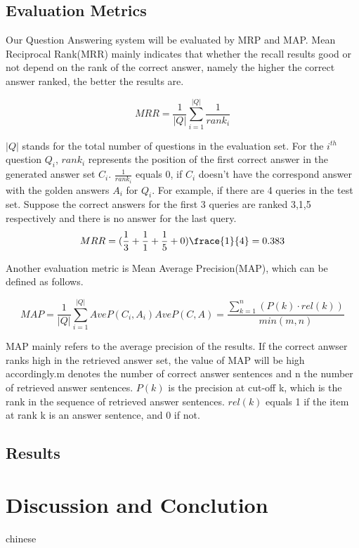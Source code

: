 \documentclass{llncs}
\begin{document}
\subsection{Evaluation Metrics}
Our Question Answering system will be evaluated by MRP and MAP. Mean Reciprocal Rank(MRR) mainly indicates that whether the recall results good or not depend on the rank of the correct answer, namely the higher the correct answer ranked, the better the results are. 

\begin{equation}
MRR=\frac{1}{|Q|}\sum_{i=1}^|Q|\frac{1}{rank_{i}}
\end{equation}

$|Q|$ stands for the total number of questions in the evaluation set. For the \(i^{th}\) question \(Q_{i}\), \(rank_{i}\) represents the position of the first correct answer in the generated answer set \(C_{i}\). \(\frac{1}{rank_{i}}\) equals 0, if \(C_{i}\) doesn't have the correspond answer with the golden answers \(A_{i}\) for \(Q_{i}\). For example, if there are 4 queries in the test set. Suppose the correct answers for the first 3 queries are ranked 3,1,5 respectively and there is no answer for the last query. 
$$MRR=(\frac{1}{3}+\frac{1}{1}+\frac{1}{5}+0)\frace{1}{4}=0.383$$

Another evaluation metric is Mean Average Precision(MAP), which can be defined as follows.

\begin{equation}
MAP=\frac{1}{|Q|}\sum_{i=1}^|Q|AveP(C_{i},A_{i})

AveP(C,A)=\frac{\sum\nolimits_{k=1}^n(P(k)\cdot{rel(k)})}{min(m,n)}
\end{equation}

MAP mainly refers to the average precision of the results. If the correct anwser ranks high in the retrieved answer set, the value of MAP will be high accordingly.m denotes the number of correct answer sentences and n the number of retrieved answer sentences. $P(k)$ is the precision at cut-off k, which is the rank in the sequence of retrieved answer sentences. $rel(k)$ equals 1 if the item at rank k is an answer sentence, and 0 if not. 


\subsection{Results}


\section{Discussion and Conclution}
\label{sec:discussion}
chinese
\cite{Li2015Component}





%
%
%



\end{document}
